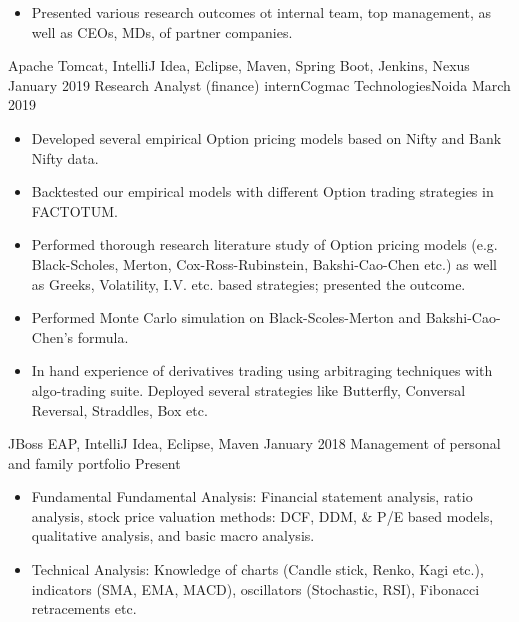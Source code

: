 \begin{experiences}
{\begin{itemize}
                        \item Presented various research outcomes ot internal team, top management, as well as CEOs, MDs, of partner companies.
                        
                      \end{itemize}
                    }
                    {Apache Tomcat, IntelliJ Idea, Eclipse, Maven, Spring Boot, Jenkins, Nexus}
  \emptySeparator
  \experience
    {January 2019}   {Research Analyst (finance) intern}{Cogmac Technologies}{Noida}
    {March 2019}    {
                      \begin{itemize}
                        \item Developed several empirical Option pricing models based on Nifty and Bank Nifty data.                          
                        \item Backtested our empirical models with different Option trading strategies in FACTOTUM.                        
                        \item Performed thorough research literature study of Option pricing models (e.g. Black-Scholes, Merton, Cox-Ross-Rubinstein, Bakshi-Cao-Chen etc.) as well as Greeks, Volatility, I.V. etc. based strategies; presented the outcome.
                        \item Performed Monte Carlo simulation on Black-Scoles-Merton and Bakshi-Cao-Chen's formula.               
                        \item In hand experience of derivatives trading using arbitraging techniques with algo-trading suite. Deployed several strategies like Butterfly, Conversal Reversal, Straddles, Box etc.
                    \end{itemize}
                    }
                    {JBoss EAP, IntelliJ Idea, Eclipse, Maven}
  \emptySeparator
  \experience
    {January 2018}     {Management of personal and family portfolio}{}{}
    {Present}    {
                      \begin{itemize}
                        \item Fundamental Fundamental Analysis: Financial statement analysis, ratio analysis, stock price valuation methods: DCF, DDM, \& P/E based models, qualitative analysis, and basic macro analysis. 
                        \item Technical Analysis: Knowledge of charts (Candle stick, Renko, Kagi etc.), indicators (SMA, EMA, MACD), oscillators (Stochastic, RSI), Fibonacci retracements etc.              

\end{itemize}}
\end{experiences}
